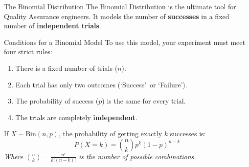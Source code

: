 \begin{frame}[allowframebreaks]{The Binomial Distribution}
    The Binomial Distribution is the ultimate tool for Quality Assurance engineers. It models the number of \textbf{successes} in a fixed number of \textbf{independent trials}.

    \vspace{0.2cm}
    \begin{block}{Conditions for a Binomial Model}
        To use this model, your experiment must meet four strict rules:
        \begin{enumerate}
            \item There is a fixed number of trials ($n$).
            \item Each trial has only two outcomes (\lq Success\rq\ or \lq Failure\rq).
            \item The probability of success ($p$) is the same for every trial.
            \item The trials are completely \textbf{independent}.
        \end{enumerate}
    \end{block}


    \begin{definition}
        If $X \sim \text{Bin}(n, p)$, the probability of getting exactly $k$ successes is:
        \[ P(X=k) = \binom{n}{k} p^k (1-p)^{n-k} \]
        \textit{Where $\binom{n}{k} = \frac{n!}{k!(n-k)!}$ is the number of possible combinations.}
    \end{definition}
\end{frame}

